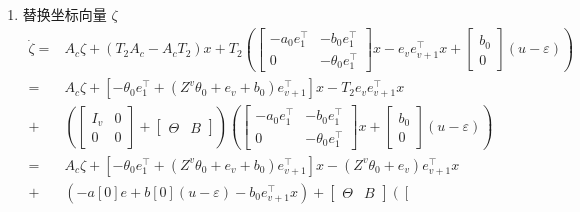 \documentclass[a4paper,12pt]{article}
\begin{document}
\begin{enumerate}
    \item 替换坐标向量 $\zeta$
    \begin{align*}
        \dot{\zeta} = &   
        A_c \zeta + (T_2A_c-A_cT_2)x +
        T_2 \left(
        \left[
        \begin{array}{c|c}
        -a_0e_1^\top & -b_0e_1^\top\\ \hline
        0 & -\theta_0e_1^\top 
        \end{array}
        \right]
        x - e_ve_{v+1}^\top x + 
        \begin{bmatrix}
            b_0 \\ 0
        \end{bmatrix} 
        (u-\varepsilon)
        \right)
        \\ = &
        A_c \zeta + 
        [-{\theta_0}e_1^\top 
        +(Z^v{\theta_0}+e_v+{b_0})e_{v+1}^\top]x
        - T_2 e_ve_{v+1}^\top x
        \\ + & 
        \left( 
            \begin{bmatrix}
                I_{v} & 0 \\
                0 & 0
            \end{bmatrix} +
            \left[
            \begin{array}{c|c}
            \Theta & B 
            \end{array}
            \right]
        \right) 
        \left(
        \left[
        \begin{array}{c|c}
        -a_0e_1^\top & -b_0e_1^\top\\ \hline
        0 & -\theta_0e_1^\top 
        \end{array}
        \right]
        x + \begin{bmatrix}
            b_0 \\ 0
        \end{bmatrix} 
        (u-\varepsilon)
        \right)
        \\ = & 
        A_c \zeta + 
        [-{\theta_0}e_1^\top 
        +(Z^v{\theta_0}+e_v+{b_0})e_{v+1}^\top]x
        - (Z^v{\theta_0}+e_v)e_{v+1}^\top x
        \\ + & 
        \left(-a[0]e+b[0](u-\varepsilon)-b_0e_{v+1}^\top x\right) +
        \left[
        \begin{array}{c|c}
        \Theta & B 
        \end{array}
        \right]
        \left(
        \left[
        \begin{array}{c|c}

\end{array}
\end{align*}
\end{enumerate}
\end{document}
